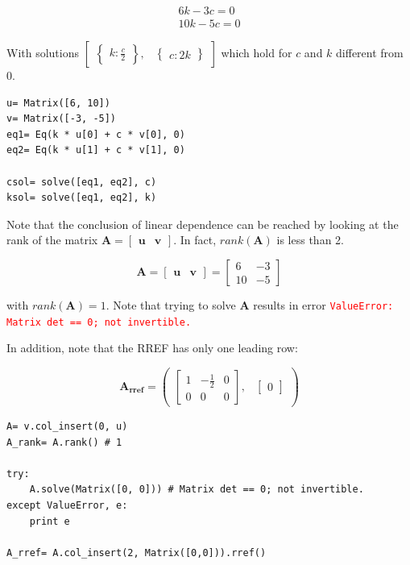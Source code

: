 $$
\begin{matrix}6 k - 3 c = 0\\10 k - 5 c = 0\end{matrix}
$$

With solutions $\begin{bmatrix}\begin{Bmatrix}k : \frac{c}{2}\end{Bmatrix}, & \begin{Bmatrix}c : 2 k\end{Bmatrix}\end{bmatrix}$
which hold for $c$ and $k$ different from 0.

\begin{verbatim}
u= Matrix([6, 10])
v= Matrix([-3, -5])
eq1= Eq(k * u[0] + c * v[0], 0)
eq2= Eq(k * u[1] + c * v[1], 0)

csol= solve([eq1, eq2], c)
ksol= solve([eq1, eq2], k)
\end{verbatim}

Note that the conclusion of linear dependence can be reached by looking at the
rank of the matrix $\mathbf{A}= \left[\begin{matrix}\mathbf{u} & \mathbf{v}\end{matrix}\right]$.
In fact, $rank(\mathbf{A})$ is less than 2.

$$
\mathbf{A} = \left[\begin{matrix}\mathbf{u} & \mathbf{v}\end{matrix}\right]
= \left[\begin{matrix}6 & -3\\10 & -5\end{matrix}\right]
$$

with $rank(\mathbf{A}) = 1$. Note that trying to solve \textbf{A} results in
\sympy error \textcolor{red}{\texttt{ValueError: Matrix det == 0; not invertible.}}

In addition, note that the RREF has only one leading row:

$$
\mathbf{A_{rref}} = \begin{pmatrix}\left[\begin{matrix}1 & - \frac{1}{2} & 0\\0 & 0 & 0\end{matrix}\right], & \begin{bmatrix}0\end{bmatrix}\end{pmatrix}
$$

\begin{verbatim}
A= v.col_insert(0, u)
A_rank= A.rank() # 1

try:
    A.solve(Matrix([0, 0])) # Matrix det == 0; not invertible.
except ValueError, e:
    print e
    
A_rref= A.col_insert(2, Matrix([0,0])).rref()
\end{verbatim}

